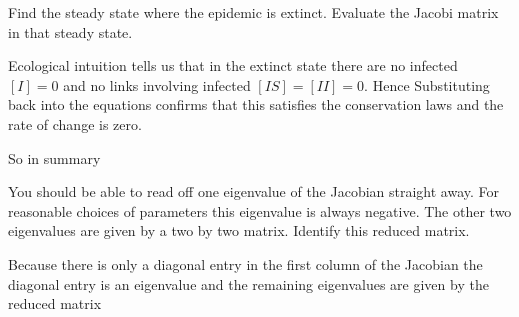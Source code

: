 

\subquestion Find the steady state where the epidemic is extinct. Evaluate the Jacobi matrix in that steady state.

\solution
Ecological intuition tells us that in the extinct state there are no infected $[I]=0$ and no links involving infected $[IS]=[II]=0$. Hence
Substituting back into the equations confirms that this satisfies the conservation laws and the rate of change is zero. 


 



So in summary

\subquestion 
You should be able to read off one eigenvalue of the Jacobian straight away. For reasonable choices of parameters this eigenvalue is always negative. The other two eigenvalues are given by a two by two matrix. 
Identify this reduced matrix. 

\solution
Because there is only a diagonal entry in the first column of the Jacobian the diagonal entry is an eigenvalue 
and the remaining eigenvalues are given by the reduced matrix 

